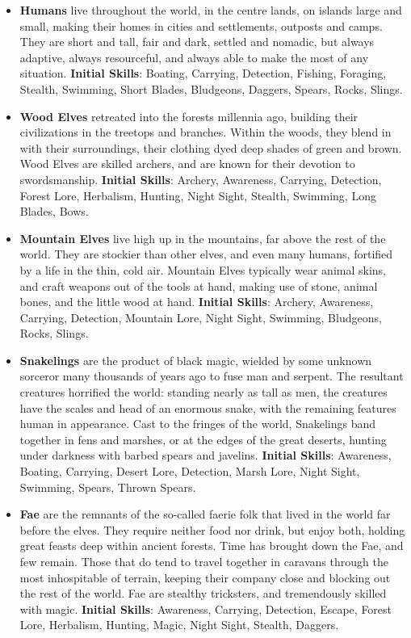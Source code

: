 \begin{itemize}
\item {\bf Humans} live throughout the world, in the centre lands, on
islands large and small, making their homes in cities and settlements, 
outposts and camps.  They are short and tall, fair and dark, settled and 
nomadic, but always adaptive, always resourceful, and always able to make 
the most of any situation. \textbf{Initial Skills}: Boating, Carrying,
Detection, Fishing, Foraging, Stealth, Swimming, Short Blades, Bludgeons,
Daggers, Spears, Rocks, Slings.

\item {\bf Wood Elves} retreated into the forests millennia ago, building 
their civilizations in the treetops and branches.  Within the woods, they 
blend in with their surroundings, their clothing dyed deep shades of green 
and brown.  Wood Elves are skilled archers, and are known for their 
devotion to swordsmanship. \textbf{Initial Skills}: Archery, Awareness,
Carrying, Detection, Forest Lore, Herbalism, Hunting, Night Sight, Stealth,
Swimming, Long Blades, Bows.

\item {\bf Mountain Elves} live high up in the mountains, far above the 
rest of the world.  They are stockier than other elves, and even many 
humans, fortified by a life in the thin, cold air.  Mountain Elves 
typically wear animal skins, and craft weapons out of the tools at hand, 
making use of stone, animal bones, and the little wood at hand.
\textbf{Initial Skills}: Archery, Awareness, Carrying, Detection, 
Mountain Lore, Night Sight, Swimming, Bludgeons, Rocks, Slings.

\item {\bf Snakelings} are the product of black magic, wielded by some
unknown sorceror many thousands of years ago to fuse man and serpent. 
The resultant creatures horrified the world: standing nearly as tall as men,
the creatures have the scales and head of an enormous snake, with the 
remaining features human in appearance.  Cast to the fringes of the world, 
Snakelings band together in fens and marshes, or at the edges of the great
deserts, hunting under darkness with barbed spears and javelins.  
\textbf{Initial Skills}: Awareness, Boating, Carrying, Desert Lore, Detection,
Marsh Lore, Night Sight, Swimming, Spears, Thrown Spears.

\item {\bf Fae} are the remnants of the so-called faerie folk that lived in
the world far before the elves.  They require neither food nor drink, but 
enjoy both, holding great feasts deep within ancient forests.  Time has 
brought down the Fae, and few remain.  Those that do tend to travel 
together in caravans through the most inhospitable of terrain, keeping 
their company close and blocking out the rest of the world.  Fae are 
stealthy tricksters, and tremendously skilled with magic. 
\textbf{Initial Skills}: Awareness, Carrying, Detection, Escape, Forest
Lore, Herbalism, Hunting, Magic, Night Sight, Stealth, Daggers.


\end{itemize}
